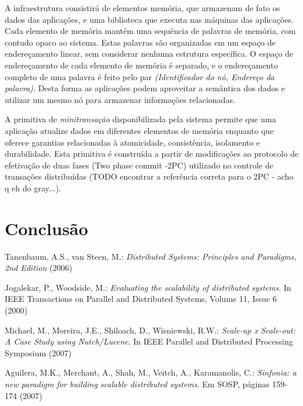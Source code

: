 \documentclass[11pt,twoside,a4paper]{book}
\begin{document}
A infraestrutura consistirá de elementos memória, que armazenam de fato os dados das aplicações, e uma biblioteca que executa nas máquinas das aplicações. Cada elemento de memória mantém uma sequência de palavras de memória, com contudo opaco ao sistema. Estas palavras são organizadas em um espaço de endereçamento linear, sem considerar nenhuma estrutura específica. O espaço de endereçamento de cada elemento de memória é separado, e o endereçamento completo de uma palavra é feito pelo par {\em (Identificador do nó, Endereço da palavra)}. Desta forma as aplicações podem aproveitar a semântica dos dados e utilizar um mesmo nó para armazenar informações relacionadas.

A primitiva de {\em minitransação} disponibilizada pela sistema permite que uma aplicação atualize dados em diferentes elementos de memória enquanto que oferece garantias relacionadas à atomicidade, consistência, isolamento e durabilidade. Esta primitiva é construída a partir de modificações ao protocolo de efetivação de duas fases (Two phase commit -2PC) utilizado no controle de transações distribuídas (TODO encontrar a referência correta para o 2PC - acho q eh do gray...). 

\chapter{Conclusão}

\begin{thebibliography}{99}

 Tanenbaum, A.S., van Steen, M.: {\em Distributed Systems: Principles and Paradigms, 2nd Edition} (2006)

 Jogalekar, P., Woodside, M.: {\em Evaluating the scalability of distributed systems}. In IEEE Transactions on Parallel and Distributed Systems, Volume 11, Issue 6 (2000)

 Michael, M., Moreira, J.E., Shiloach, D., Wisniewski, R.W.: {\em Scale-up x Scale-out: A Case Study using Nutch/Lucene}. In IEEE Parallel and Distributed Processing Symposium (2007)

 Aguilera, M.K., Merchant, A., Shah, M., Veitch, A., Karamanolis, C.: {\em Sinfonia: a new paradigm for building scalable distributed systems}. Em SOSP, páginas 159-174 (2007)

\end{thebibliography}
\end{document}
